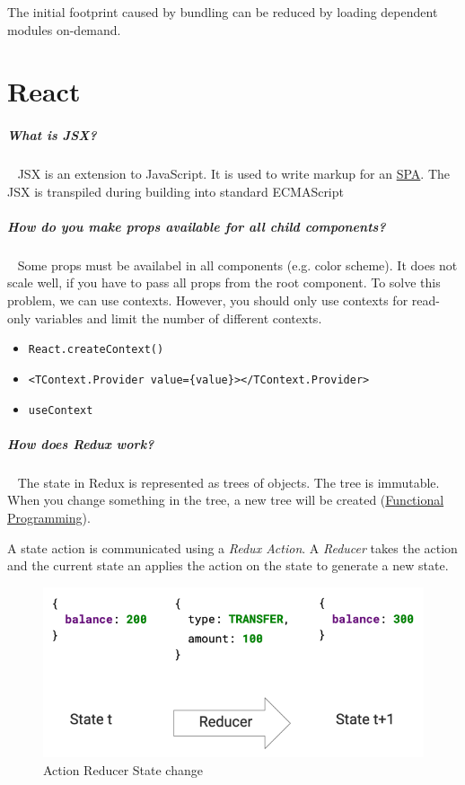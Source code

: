 \documentclass[11pt,twoside,landscape]{article}
\begin{document}
\begin{multicols}{4}
The initial footprint caused by bundling can be reduced by loading dependent modules on-demand.
\section{React}
\label{sec:org40ed265}
\subparagraph{What is JSX?} \
\label{sec:org47a310f}
JSX is an extension to JavaScript.
It is used to write markup for an \href{../../../roam/20231228102611-what_is_a_single_page_application.org}{SPA}.
The JSX is transpiled during building into standard ECMAScript
\subparagraph{How do you make props available for all child components?} \
\label{sec:org3a5127a}
Some props must be availabel in all components (e.g. color scheme).
It does not scale well, if you have to pass all props from the root component.
To solve this problem, we can use contexts.
However, you should only use contexts for read-only variables and limit the number of different contexts.

\begin{itemize}
\item \texttt{React.createContext()}
\item \texttt{<TContext.Provider value=\{value\}></TContext.Provider>}
\item \texttt{useContext}
\end{itemize}
\subparagraph{How does Redux work?} \
\label{sec:org1b8c44e}
The state in Redux is represented as trees of objects.
The tree is immutable.
When you change something in the tree, a new tree will be created (\href{../../../roam/20220616080932-functional_programming.org}{Functional Programming}).

A state action is communicated using a \emph{Redux Action}.
A \emph{Reducer} takes the action and the current state an applies the action on the state to generate a new state.

\begin{figure}[htbp]
\centering
\includegraphics[width=.9\linewidth]{img/redux_action_reducer.png}
\caption{\label{fig:action-reducer-state-change}Action Reducer State change}
\end{figure}

\end{multicols}
\end{document}

